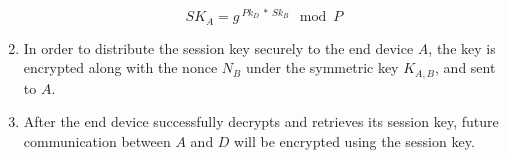 \begin{enumerate}
\begin{equation}
\label{eq:ska}
SK_A = g^{\ Pk_{D}\ *\ Sk_B} \mod P
\end{equation}

\item In order to distribute the session key securely to the end device $A$, the key is encrypted along with the nonce $N_B$ under the symmetric key $K_{A,B}$, and sent to $A$.

\item After the end device successfully decrypts and retrieves its session key, future communication between $A$ and $D$ will be encrypted using the session key. 

\end{enumerate}




%
%


